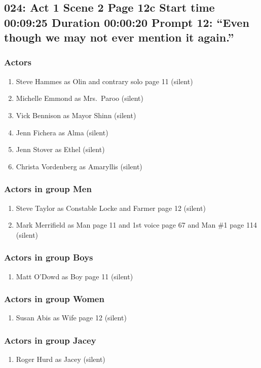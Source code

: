 \subsection{024: Act 1 Scene 2 Page 12c Start time 00:09:25 Duration 00:00:20 Prompt 12: ``Even though we may not ever mention it again.''}

\subsubsection{Actors}
\begin{enumerate}
\item Steve Hammes as Olin and contrary solo page 11 (silent)
\item Michelle Emmond as Mrs.~Paroo (silent)
\item Vick Bennison as Mayor Shinn (silent)
\item Jenn Fichera as Alma (silent)
\item Jenn Stover as Ethel (silent)
\item Christa Vordenberg as Amaryllis (silent)
\end{enumerate}
\subsubsection{Actors in group Men}
\begin{enumerate}
\item Steve Taylor as Constable Locke and Farmer page 12 (silent)
\item Mark Merrifield as Man page 11 and 1st voice page 67 and Man \#1 page 114 (silent)
\end{enumerate}
\subsubsection{Actors in group Boys}
\begin{enumerate}
\item Matt O'Dowd as Boy page 11 (silent)
\end{enumerate}
\subsubsection{Actors in group Women}
\begin{enumerate}
\item Susan Abis as Wife page 12 (silent)
\end{enumerate}
\subsubsection{Actors in group Jacey}
\begin{enumerate}
\item Roger Hurd as Jacey (silent)
\end{enumerate}

